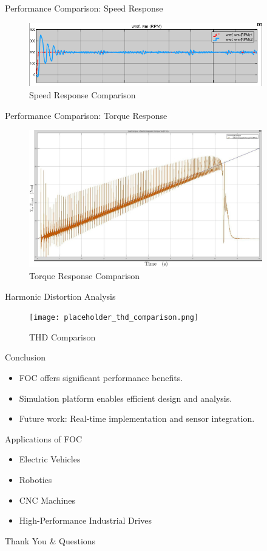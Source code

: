 \documentclass{beamer}
\begin{document}
\begin{frame}{Performance Comparison: Speed Response}
  \begin{figure}
    \includegraphics[width=4in]{conference/Speed_conf.png} %
    \caption{Speed Response Comparison}
  \end{figure}
\end{frame}

\begin{frame}{Performance Comparison: Torque Response}
  \begin{figure}
    \includegraphics[width=4in]{conference/60rpmTorque.jpeg} %
    \caption{Torque Response Comparison}
  \end{figure}
\end{frame}

\begin{frame}{Harmonic Distortion Analysis}
  \begin{figure}
    \texttt{[image: placeholder\_thd\_comparison.png]} %
    \caption{THD Comparison}
  \end{figure}
\end{frame}

\begin{frame}{Conclusion}
  \begin{itemize}
    \item FOC offers significant performance benefits.
    \item Simulation platform enables efficient design and analysis.
    \item Future work: Real-time implementation and sensor integration.
  \end{itemize}
\end{frame}

\begin{frame}{Applications of FOC}
  \begin{itemize}
    \item Electric Vehicles
    \item Robotics
    \item CNC Machines
    \item High-Performance Industrial Drives
  \end{itemize}
\end{frame}

\begin{frame}{Thank You \& Questions}
\end{frame}
\end{document}
